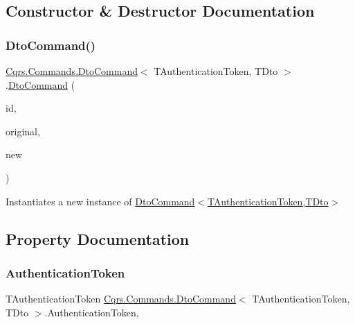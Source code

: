 \subsection{Constructor \& Destructor Documentation}
\mbox{\label{classCqrs_1_1Commands_1_1DtoCommand_a705b7bdee6a242dd56821c60b4040b23_a705b7bdee6a242dd56821c60b4040b23}} 
\subsubsection{\texorpdfstring{Dto\+Command()}{DtoCommand()}}
{\footnotesize\ttfamily \hyperlink{classCqrs_1_1Commands_1_1DtoCommand}{Cqrs.\+Commands.\+Dto\+Command}$<$ T\+Authentication\+Token, T\+Dto $>$.\hyperlink{classCqrs_1_1Commands_1_1DtoCommand}{Dto\+Command} (\begin{DoxyParamCaption}\item[{Guid}]{id,  }\item[{T\+Dto}]{original,  }\item[{T\+Dto @}]{new }\end{DoxyParamCaption})}



Instantiates a new instance of \hyperlink{classCqrs_1_1Commands_1_1DtoCommand_a705b7bdee6a242dd56821c60b4040b23_a705b7bdee6a242dd56821c60b4040b23}{Dto\+Command$<$\+T\+Authentication\+Token,\+T\+Dto$>$} 



\subsection{Property Documentation}
\mbox{\label{classCqrs_1_1Commands_1_1DtoCommand_aedf535bfbf04e3532c90e69548b85c32_aedf535bfbf04e3532c90e69548b85c32}} 
\subsubsection{\texorpdfstring{Authentication\+Token}{AuthenticationToken}}
{\footnotesize\ttfamily T\+Authentication\+Token \hyperlink{classCqrs_1_1Commands_1_1DtoCommand}{Cqrs.\+Commands.\+Dto\+Command}$<$ T\+Authentication\+Token, T\+Dto $>$.Authentication\+Token\hspace{0.3cm}{\ttfamily [get]}, {\ttfamily [set]}}



